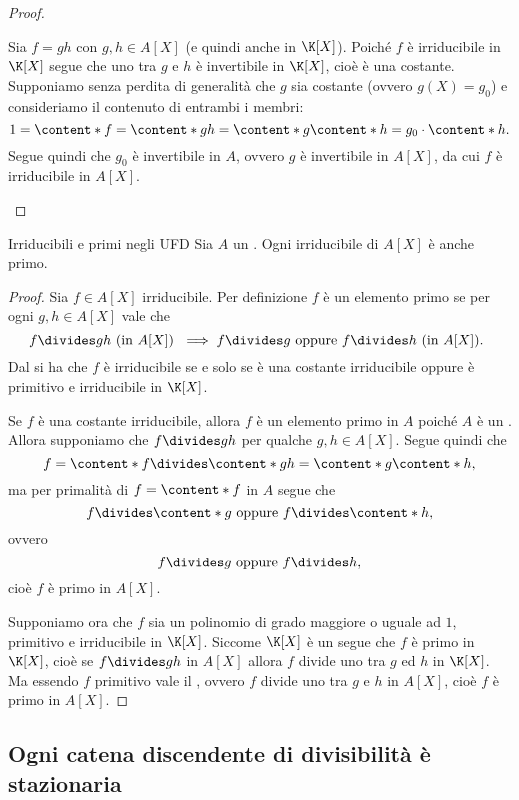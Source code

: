 \begin{proof}
\begin{description}
\begin{description}
            Sia $f = gh$ con $g, h \in A[X]$ (e quindi anche in $\K[X]$). Poiché $f$ è irriducibile in $\K[X]$ segue che uno tra $g$ e $h$ è invertibile in $\K[X]$, cioè è una costante. Supponiamo senza perdita di generalità che $g$ sia costante (ovvero $g(X) = g_0$) e consideriamo il contenuto di entrambi i membri: \[
                1 = \content*{f} = \content*{gh} = \content*{g}\content*{h} = g_0\cdot\content*{h}.
            \] Segue quindi che $g_0$ è invertibile in $A$, ovvero $g$ è invertibile in $A[X]$, da cui $f$ è irriducibile in $A[X]$. \qedhere
        \end{description} 
    \end{description}
\end{proof}

\begin{proposition}
    {Irriducibili e primi negli UFD}{}
    Sia $A$ un \UFD. Ogni irriducibile di $A[X]$ è anche primo.
\end{proposition}
\begin{proof}
    Sia $f \in A[X]$ irriducibile. Per definizione $f$ è un elemento primo se per ogni $g, h \in A[X]$ vale che \[
        f \divides gh \text{ (in $A[X]$) } \implies f \divides g \text{ oppure } f \divides h \text{ (in $A[X]$). }
    \] Dal  si ha che $f$ è irriducibile se e solo se è una costante irriducibile oppure è primitivo e irriducibile in $\K[X]$.
    
    Se $f$ è una costante irriducibile, allora $f$ è un elemento primo in $A$ poiché $A$ è un \UFD. Allora supponiamo che $f \divides gh$ per qualche $g, h \in A[X]$. Segue quindi che \[
        f = \content*{f} \divides \content*{gh} = \content*{g}\content*{h},
    \] ma per primalità di $f = \content*{f}$ in $A$ segue che \[
        f \divides \content*{g} \text{ oppure } f \divides \content*{h},
    \] ovvero \[
        f \divides g \text{ oppure } f \divides h,
    \] cioè $f$ è primo in $A[X]$.

    Supponiamo ora che $f$ sia un polinomio di grado maggiore o uguale ad $1$, primitivo e irriducibile in $\K[X]$. Siccome $\K[X]$ è un \ED segue che $f$ è primo in $\K[X]$, cioè se $f \divides gh$ in $A[X]$ allora $f$ divide uno tra $g$ ed $h$ in $\K[X]$. Ma essendo $f$ primitivo vale il , ovvero $f$ divide uno tra $g$ e $h$ in $A[X]$, cioè $f$ è primo in $A[X]$. 
\end{proof}

\subsection*{Ogni catena discendente di divisibilità è stazionaria}

